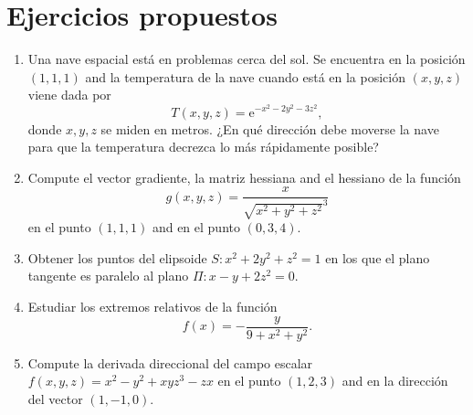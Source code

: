\section{Ejercicios propuestos}
\begin{enumerate}[leftmargin=*]
\item Una nave espacial está en problemas cerca del sol.
      Se encuentra en la posición $(1,1,1)$ and la temperatura de la nave cuando está en la posición $(x,y,z)$ viene dada por
      \[T(x,y,z)=\mbox{e}^{-x^2-2y^2-3z^2},\]
      donde $x,y,z$ se miden en metros.
      ¿En qué dirección debe moverse la nave para que la temperatura decrezca lo más rápidamente posible?

\item Compute el vector gradiente, la matriz hessiana and el hessiano de la función
      \[
      g(x,y,z) = \frac{x}{\sqrt{x^2+y^2+z^2}^3}
      \]
      en el punto $(1,1,1)$ and en el punto $(0,3,4)$.

\item Obtener los puntos del elipsoide $S: x^2+2y^2+z^2=1$ en los que el plano tangente es paralelo al plano $\Pi:
      x-y+2z^2=0$.

\item Estudiar los extremos relativos de la función
      \[
      f(x)=-\frac{y}{9+x^2+y^2}.
      \]

\item Compute la derivada direccional del campo escalar $f(x,y,z)=x^2-y^2+xyz^3-zx$ en el punto $(1,2,3)$ and en la
      dirección del vector $(1,-1,0)$.
\end{enumerate}
